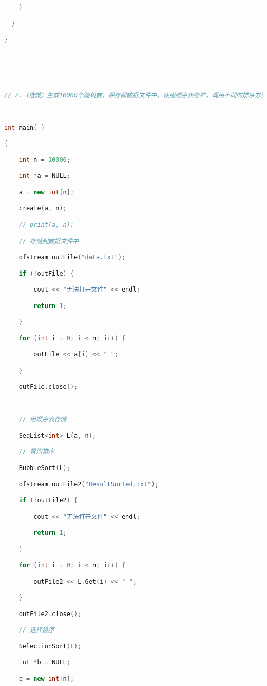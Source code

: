 \begin{lstlisting}[language=C++]
    }

  }

}

  
  
  
  

// 2.（选做）生成10000个随机数，保存都数据文件中，使用顺序表存贮，调用不同的排序方法，排序后结果保存到数据文件ResultSorted.txt中。

  

int main( )

{

    int n = 10000;

    int *a = NULL;

    a = new int[n];

    create(a, n);

    // print(a, n);

    // 存储到数据文件中

    ofstream outFile("data.txt");

    if (!outFile) {

        cout << "无法打开文件" << endl;

        return 1;

    }

    for (int i = 0; i < n; i++) {

        outFile << a[i] << " ";

    }

    outFile.close();

  

    // 用顺序表存储

    SeqList<int> L(a, n);

    // 冒泡排序

    BubbleSort(L);

    ofstream outFile2("ResultSorted.txt");

    if (!outFile2) {

        cout << "无法打开文件" << endl;

        return 1;

    }

    for (int i = 0; i < n; i++) {

        outFile2 << L.Get(i) << " ";

    }

    outFile2.close();

    // 选择排序

    SelectionSort(L);

    int *b = NULL;

    b = new int[n];


\end{lstlisting}

